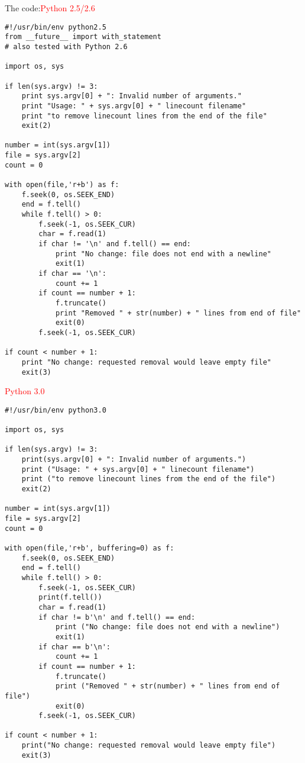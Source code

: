 The code:\textcolor{red}{Python 2.5/2.6}
\begin{verbatim}
#!/usr/bin/env python2.5
from __future__ import with_statement
# also tested with Python 2.6

import os, sys

if len(sys.argv) != 3:
    print sys.argv[0] + ": Invalid number of arguments."
    print "Usage: " + sys.argv[0] + " linecount filename"
    print "to remove linecount lines from the end of the file"
    exit(2)

number = int(sys.argv[1])
file = sys.argv[2]
count = 0

with open(file,'r+b') as f:
    f.seek(0, os.SEEK_END)
    end = f.tell()
    while f.tell() > 0:
        f.seek(-1, os.SEEK_CUR)
        char = f.read(1)
        if char != '\n' and f.tell() == end:
            print "No change: file does not end with a newline"
            exit(1)
        if char == '\n':
            count += 1
        if count == number + 1:
            f.truncate()
            print "Removed " + str(number) + " lines from end of file"
            exit(0)
        f.seek(-1, os.SEEK_CUR)

if count < number + 1:
    print "No change: requested removal would leave empty file"
    exit(3)
\end{verbatim}

\textcolor{red}{Python 3.0}
\begin{verbatim}
#!/usr/bin/env python3.0

import os, sys

if len(sys.argv) != 3:
    print(sys.argv[0] + ": Invalid number of arguments.")
    print ("Usage: " + sys.argv[0] + " linecount filename")
    print ("to remove linecount lines from the end of the file")
    exit(2)

number = int(sys.argv[1])
file = sys.argv[2]
count = 0

with open(file,'r+b', buffering=0) as f:
    f.seek(0, os.SEEK_END)
    end = f.tell()
    while f.tell() > 0:
        f.seek(-1, os.SEEK_CUR)
        print(f.tell())
        char = f.read(1)
        if char != b'\n' and f.tell() == end:
            print ("No change: file does not end with a newline")
            exit(1)
        if char == b'\n':
            count += 1
        if count == number + 1:
            f.truncate()
            print ("Removed " + str(number) + " lines from end of file")
            exit(0)
        f.seek(-1, os.SEEK_CUR)

if count < number + 1:
    print("No change: requested removal would leave empty file")
    exit(3)
\end{verbatim}

